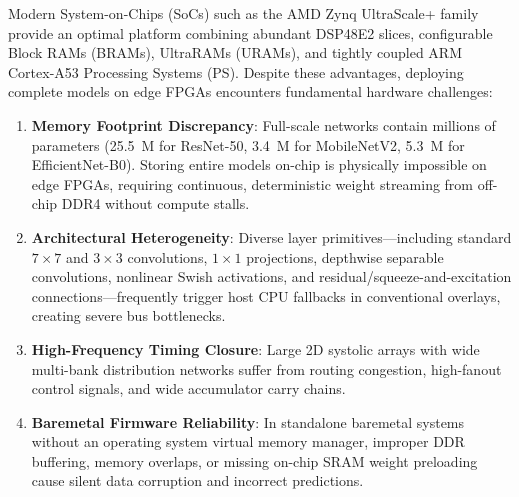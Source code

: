 \documentclass[10pt,journal,compsoc]{IEEEtran}
\begin{document}
Modern System-on-Chips (SoCs) such as the AMD Zynq UltraScale+ family provide an optimal platform combining abundant DSP48E2 slices, configurable Block RAMs (BRAMs), UltraRAMs (URAMs), and tightly coupled ARM Cortex-A53 Processing Systems (PS). Despite these advantages, deploying complete models on edge FPGAs encounters fundamental hardware challenges:
\begin{enumerate}
    \item \textbf{Memory Footprint Discrepancy}: Full-scale networks contain millions of parameters (25.5~M for ResNet-50, 3.4~M for MobileNetV2, 5.3~M for EfficientNet-B0). Storing entire models on-chip is physically impossible on edge FPGAs, requiring continuous, deterministic weight streaming from off-chip DDR4 without compute stalls.
    \item \textbf{Architectural Heterogeneity}: Diverse layer primitives---including standard $7\times7$ and $3\times3$ convolutions, $1\times1$ projections, depthwise separable convolutions, nonlinear Swish activations, and residual/squeeze-and-excitation connections---frequently trigger host CPU fallbacks in conventional overlays, creating severe bus bottlenecks.
    \item \textbf{High-Frequency Timing Closure}: Large 2D systolic arrays with wide multi-bank distribution networks suffer from routing congestion, high-fanout control signals, and wide accumulator carry chains.
    \item \textbf{Baremetal Firmware Reliability}: In standalone baremetal systems without an operating system virtual memory manager, improper DDR buffering, memory overlaps, or missing on-chip SRAM weight preloading cause silent data corruption and incorrect predictions.
\end{enumerate}
\end{document}
